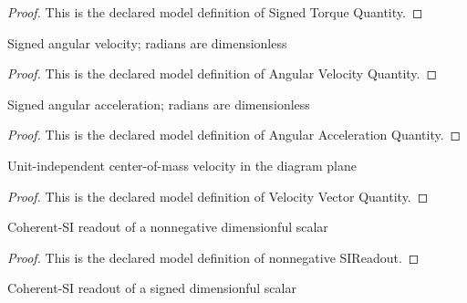\begin{proof}
  This is the declared model definition of Signed Torque Quantity.
\end{proof}
\begin{definition}
  \label{def:physics:phyx-mini-0703:phyxminiproblems-problemphyxmini0703-angularvelocityquantity}
  Signed angular velocity; radians are dimensionless
\end{definition}
\begin{proof}
  This is the declared model definition of Angular Velocity Quantity.
\end{proof}
\begin{definition}
  \label{def:physics:phyx-mini-0703:phyxminiproblems-problemphyxmini0703-angularaccelerationquantity}
  Signed angular acceleration; radians are dimensionless
\end{definition}
\begin{proof}
  This is the declared model definition of Angular Acceleration Quantity.
\end{proof}
\begin{definition}
  \label{def:physics:phyx-mini-0703:phyxminiproblems-problemphyxmini0703-velocityvectorquantity}
  Unit-independent center-of-mass velocity in the diagram plane
\end{definition}
\begin{proof}
  This is the declared model definition of Velocity Vector Quantity.
\end{proof}
\begin{definition}
  \label{def:physics:phyx-mini-0703:phyxminiproblems-problemphyxmini0703-nonnegativesireadout}
  Coherent-SI readout of a nonnegative dimensionful scalar
\end{definition}
\begin{proof}
  This is the declared model definition of nonnegative SIReadout.
\end{proof}
\begin{definition}
  \label{def:physics:phyx-mini-0703:phyxminiproblems-problemphyxmini0703-signedsireadout}
  Coherent-SI readout of a signed dimensionful scalar
\end{definition}
